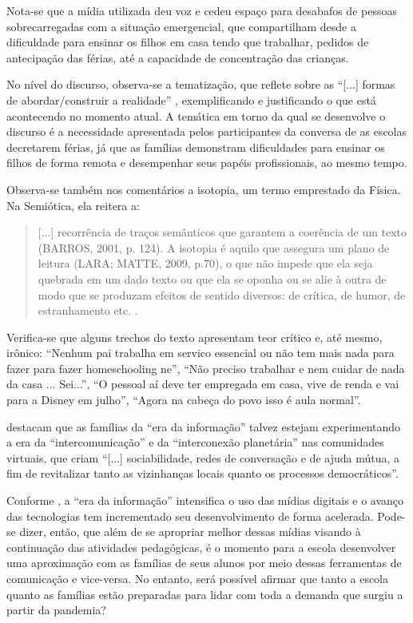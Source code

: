 \documentclass{textolivre}
\begin{document}

Nota-se que a mídia utilizada deu voz e cedeu espaço para desabafos de pessoas sobrecarregadas com a situação emergencial, que compartilham desde a dificuldade para ensinar os filhos em casa tendo que trabalhar, pedidos de antecipação das férias, até a capacidade de concentração das crianças. 

No nível do discurso, observa-se a tematização, que reflete sobre as “[...] formas de abordar/construir a realidade” \cite[p. 3]{brito__2012}, exemplificando e justificando o que está acontecendo no momento atual. A temática em torno da qual se desenvolve o discurso é a necessidade apresentada pelos participantes da conversa de as escolas decretarem férias, já que as famílias demonstram dificuldades para ensinar os filhos de forma remota e desempenhar seus papéis profissionais, ao mesmo tempo.

Observa-se também nos comentários a isotopia, um termo emprestado da Física. Na Semiótica, ela reitera a:

\begin{quote}
    [...] recorrência de traços semânticos que garantem a coerência de um texto (BARROS, 2001, p. 124). A isotopia é aquilo que assegura um plano de leitura (LARA; MATTE, 2009, p.70), o que não impede que ela seja quebrada em um dado texto ou que ela se oponha ou se alie à outra de modo que se produzam efeitos de sentido diversos: de crítica, de humor, de estranhamento etc. \cite[p. 3]{brito__2012}.
\end{quote}

Verifica-se que alguns trechos do texto apresentam teor crítico e, até mesmo, irônico: “Nenhum pai trabalha em servico essencial ou não tem mais nada para fazer para fazer homeschooling ne”, “Não preciso trabalhar e nem cuidar de nada da casa ... Sei...”, “O pessoal aí deve ter empregada em casa, vive de renda e vai para a Disney em julho”, “Agora na cabeça do povo isso é aula normal”.

\textcite[p. 131]{lemos_o_2014} destacam que as famílias da “era da informação” talvez estejam experimentando a era da “intercomunicação” e da “interconexão planetária” nas comunidades virtuais, que criam “[...] sociabilidade, redes de conversação e de ajuda mútua, a fim de revitalizar tanto as vizinhanças locais quanto os processos democráticos”. 

Conforme \textcite{boechat_as_2017}, a “era da informação” intensifica o uso das mídias digitais e o avanço das tecnologias tem incrementado seu desenvolvimento de forma acelerada. Pode-se dizer, então, que além de se apropriar melhor dessas mídias visando à continuação das atividades pedagógicas, é o momento para a escola desenvolver uma aproximação com as famílias de seus alunos por meio dessas ferramentas de comunicação e vice-versa. No entanto, será possível afirmar que tanto a escola quanto as famílias estão preparadas para lidar com toda a demanda que surgiu a partir da pandemia? 
\end{document}
